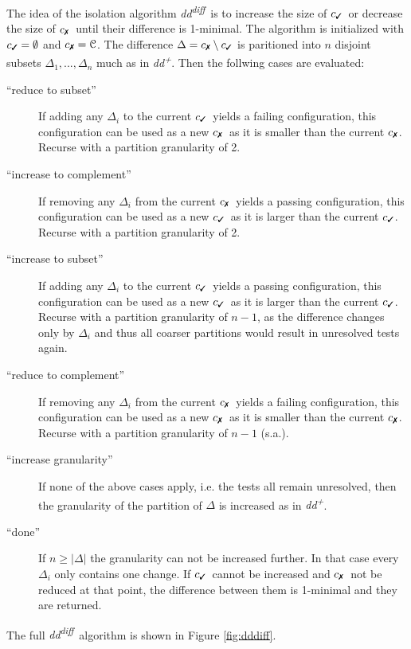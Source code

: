 \documentclass[a4paper,UKenglish]{lipics-v2018}
\newcommand{\ddp}{\textit{dd\textsuperscript{+}}}
\newcommand{\dddiff}{\textit{dd\textsuperscript{diff}}}
\newcommand{\C}[0]{\ensuremath{\mathcal{C}}}
\newcommand{\cmark}{\text{\ding{51}}}
\newcommand{\xmark}{\text{\ding{55}}}
\newcommand{\cpass}{\ensuremath{c_{\cmark}}}
\newcommand{\cfail}{\ensuremath{c_{\xmark}}}
\begin{document}
The idea of the isolation algorithm \dddiff\ is to increase the size of \cpass\ or decrease the size of \cfail\ until their difference is 1-minimal. The algorithm is initialized with $\cpass = \emptyset$ and $\cfail = \C$. The difference $\Delta = \cfail \setminus \cpass$ is paritioned into $n$ disjoint subsets $\Delta_1, ..., \Delta_n$ much as in \ddp. Then the follwing cases are evaluated:

\begin{description}
  	\item[``reduce to subset''] If adding any $\Delta_i$ to the current \cpass\ yields a failing configuration, this configuration can be used as a new \cfail\ as it is smaller than the current \cfail. Recurse with a partition granularity of 2.
  	\item[``increase to complement''] If removing any $\Delta_i$ from the current \cfail\ yields a passing configuration, this configuration can be used as a new \cpass\ as it is larger than the current \cpass. Recurse with a partition granularity of 2.
  	\item[``increase to subset''] If adding any $\Delta_i$ to the current \cpass\ yields a passing configuration, this configuration can be used as a new \cpass\ as it is larger than the current \cpass. Recurse with a partition granularity of $n-1$, as the difference changes only by $\Delta_i$ and thus all coarser partitions would result in unresolved tests again.
  	\item[``reduce to complement''] If removing any $\Delta_i$ from the current \cfail\ yields a failing configuration, this configuration can be used as a new \cfail\, as it is smaller than the current \cfail. Recurse with a partition granularity of $n-1$ (s.a.).
  	\item[``increase granularity''] If none of the above cases apply, i.e. the tests all remain unresolved, then the granularity of the partition of $\Delta$ is increased as in \ddp. 
  	\item[``done''] If $n \ge |\Delta|$ the granularity can not be increased further. In that case every $\Delta_i$ only contains one change. If \cpass\ cannot be increased and \cfail\ not be reduced at that point, the difference between them is 1-minimal and they are returned.\\
\end{description}
The full \dddiff\ algorithm is shown in Figure \ref{fig:dddiff}.\\
\end{document}
